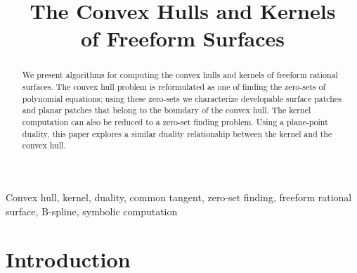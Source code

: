 \documentclass[doublespacing]{elsart}
\begin{document}
\begin{frontmatter}



\title{The Convex Hulls and Kernels\\ of Freeform Surfaces}


\author{}

\address{}

\begin{abstract}

\noindent 
We present algorithms for computing the convex hulls and kernels of
freeform rational surfaces.  The convex hull problem is reformulated
as one of finding the zero-sets of polynomial equations;
using these zero-sets
we characterize developable surface patches and planar patches
that belong to the boundary of the convex hull.
The kernel computation can also be reduced to a zero-set finding problem.
Using a plane-point duality, this paper explores a similar 
duality relationship between the kernel and the convex hull.

\end{abstract}

\begin{keyword}
Convex hull, kernel, duality, common tangent, zero-set finding,
freeform rational surface, B-spline, symbolic computation
\end{keyword}

\end{frontmatter}

\section{Introduction}
\label{sec-introduction}
\end{document}
